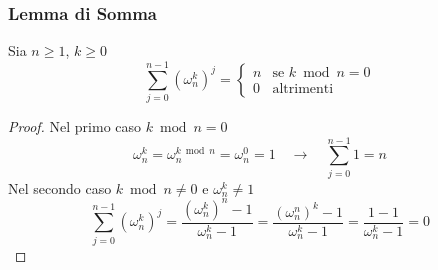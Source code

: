 \subsubsection{Lemma di Somma}
\begin{lemma}
    Sia $n \geq 1$, $k \geq 0$
    \begin{equation*}
        \sum_{j=0}^{n-1} \left( \omega_n^k \right)^j = 
        \begin{cases}
            n & \text{se } k \bmod n = 0 \\
            0 & \text{altrimenti}
        \end{cases}
    \end{equation*}
    \label{teo:somma}
\end{lemma}
\begin{proof}
    Nel primo caso $k \bmod n = 0$
    \begin{equation*}
        \omega_n^k = \omega_n^{k \bmod n} = \omega_n^0 = 1
        \quad \rightarrow \quad
        \sum_{j=0}^{n-1} 1 = n
    \end{equation*}
    Nel secondo caso $k \bmod n \neq 0$ e $\omega_n^k \neq 1$
    \begin{equation*}
        \sum_{j=0}^{n-1} \left( \omega_n^k \right)^j = 
        \frac{\left( \omega_n^k \right)^n -1}{\omega_n^k -1} =
        \frac{\left( \omega_n^n \right)^k -1}{\omega_n^k -1} =
        \frac{1 -1}{\omega_n^k -1} = 0
    \end{equation*}
\end{proof}

